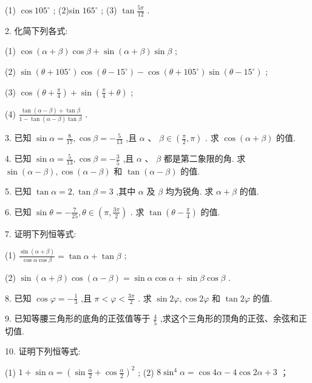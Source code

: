 \documentclass[10pt]{article}
\begin{document}
(1) \(\cos {105}^{ \circ  }\) ; (2)sin \({165}^{ \circ  }\) ; (3) \(\tan \frac{5\pi }{12}\) .

2. 化简下列各式:

(1) \(\cos \left( {\alpha  + \beta }\right) \cos \beta  + \sin \left( {\alpha  + \beta }\right) \sin \beta\) ;

(2) \(\sin \left( {\theta  + {105}^{ \circ  }}\right) \cos \left( {\theta  - {15}^{ \circ  }}\right)  - \cos \left( {\theta  + {105}^{ \circ  }}\right) \sin \left( {\theta  - {15}^{ \circ  }}\right)\) ;

(3) \(\cos \left( {\theta  + \frac{\pi }{4}}\right)  + \sin \left( {\frac{\pi }{4} + \theta }\right)\) ;

(4) \(\frac{\tan \left( {\alpha  - \beta }\right)  + \tan \beta }{1 - \tan \left( {\alpha  - \beta }\right) \tan \beta }\) .

3. 已知 \(\sin \alpha  = \frac{8}{17},\cos \beta  =  - \frac{5}{13}\) ,且 \(\alpha \text{ 、 }\beta  \in  \left( {\frac{\pi }{2},\pi }\right)\) . 求 \(\cos \left( {\alpha  + \beta }\right)\) 的值.

4. 已知 \(\sin \alpha  = \frac{5}{13},\cos \beta  =  - \frac{3}{5}\) ,且 \(\alpha \text{ 、 }\beta\) 都是第二象限的角. 求 \(\sin \left( {\alpha  - \beta }\right) ,\cos \left( {\alpha  - \beta }\right)\) 和 \(\tan \left( {\alpha  - \beta }\right)\) 的值.

5. 已知 \(\tan \alpha  = 2,\tan \beta  = 3\) ,其中 \(\alpha\) 及 \(\beta\) 均为锐角. 求 \(\alpha  + \beta\) 的值.

6. 已知 \(\sin \theta  =  - \frac{7}{25},\theta  \in  \left( {\pi ,\frac{3\pi }{2}}\right)\) . 求 \(\tan \left( {\theta  - \frac{\pi }{4}}\right)\) 的值.

7. 证明下列恒等式:

(1) \(\frac{\sin \left( {\alpha  + \beta }\right) }{\cos \alpha \cos \beta } = \tan \alpha  + \tan \beta\) ;

(2) \(\sin \left( {\alpha  + \beta }\right) \cos \left( {\alpha  - \beta }\right)  = \sin \alpha \cos \alpha  + \sin \beta \cos \beta\) .

8. 已知 \(\cos \varphi  =  - \frac{1}{3}\) ,且 \(\pi  < \varphi  < \frac{3\pi }{2}\) . 求 \(\sin {2\varphi },\cos {2\varphi }\) 和 \(\tan {2\varphi }\) 的值.

9. 已知等腰三角形的底角的正弦值等于 \(\frac{4}{5}\) ,求这个三角形的顶角的正弦、余弦和正切值.

10. 证明下列恒等式:

(1) \(1 + \sin \alpha  = {\left( \sin \frac{\alpha }{2} + \cos \frac{\alpha }{2}\right) }^{2}\) ; (2) \(8{\sin }^{4}\alpha  = \cos {4\alpha } - 4\cos {2\alpha } + 3\) ；
\end{document}
